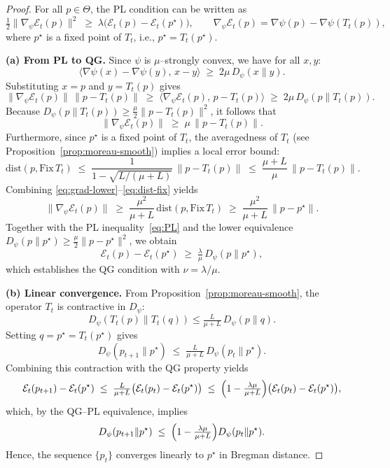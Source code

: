 \documentclass[11pt]{article}
\newcommand{\Ecal}{\mathcal{E}}
\theoremstyle{plain}
\theoremstyle{definition}
\theoremstyle{remark}
\begin{document}
\begin{proof}
For all $p\in\Theta$, the PL condition can be written as
\begin{equation}
\tfrac12\|\nabla_\psi \Ecal_t(p)\|^2 
\;\ge\; \lambda\big(\Ecal_t(p)-\Ecal_t(p^\star)\big),
\qquad
\nabla_\psi \Ecal_t(p)=\nabla\psi(p)-\nabla\psi(T_t(p)),
\label{eq:PL}
\end{equation}
where $p^\star$ is a fixed point of $T_t$, i.e., $p^\star=T_t(p^\star)$.

\medskip
\noindent\textbf{(a) From PL to QG.}
Since $\psi$ is $\mu$--strongly convex, we have for all $x,y$:
\begin{equation}
\langle \nabla\psi(x)-\nabla\psi(y),\,x-y\rangle 
\;\ge\; 2\mu\,D_\psi(x\|y).
\label{eq:psi-strong}
\end{equation}
Substituting $x=p$ and $y=T_t(p)$ gives
\[
\|\nabla_\psi \Ecal_t(p)\|\,\|p-T_t(p)\|
\;\ge\;
\langle\nabla_\psi \Ecal_t(p),\,p-T_t(p)\rangle
\;\ge\; 2\mu\,D_\psi(p\|T_t(p)).
\]
Because $D_\psi(p\|T_t(p))\ge \tfrac{\mu}{2}\|p-T_t(p)\|^2$, it follows that
\begin{equation}
\|\nabla_\psi \Ecal_t(p)\|\;\ge\;\mu\,\|p-T_t(p)\|.
\label{eq:grad-lower}
\end{equation}
Furthermore, since $p^\star$ is a fixed point of $T_t$, the averagedness of $T_t$ (see Proposition~\ref{prop:moreau-smooth}) implies a local error bound:
\begin{equation}
\mathrm{dist}(p,\mathrm{Fix}\,T_t)
\;\le\;
\frac{1}{1-\sqrt{L/(\mu+L)}}\,\|p-T_t(p)\|
\;\le\;\frac{\mu+L}{\mu}\,\|p-T_t(p)\|.
\label{eq:dist-fix}
\end{equation}
Combining \eqref{eq:grad-lower}--\eqref{eq:dist-fix} yields
\[
\|\nabla_\psi \Ecal_t(p)\|
\;\ge\;\frac{\mu^2}{\mu+L}\,\mathrm{dist}(p,\mathrm{Fix}\,T_t)
\;\ge\;\frac{\mu^2}{\mu+L}\,\|p-p^\star\|.
\]
Together with the PL inequality~\eqref{eq:PL} and the lower equivalence 
$D_\psi(p\|p^\star)\ge\tfrac{\mu}{2}\|p-p^\star\|^2$, we obtain
\[
\Ecal_t(p)-\Ecal_t(p^\star)
\;\ge\;
\tfrac{\lambda}{\mu}\,D_\psi(p\|p^\star),
\]
which establishes the QG condition with $\nu=\lambda/\mu$.

\medskip
\noindent\textbf{(b) Linear convergence.}
From Proposition~\ref{prop:moreau-smooth}, the operator $T_t$ is contractive in $D_\psi$:
\begin{equation}
D_\psi(T_t(p)\|T_t(q))\le\tfrac{L}{\mu+L}\,D_\psi(p\|q).
\label{eq:averaged-bound}
\end{equation}
Setting $q=p^\star=T_t(p^\star)$ gives
\[
D_\psi(p_{t+1}\|p^\star)
\;\le\;\tfrac{L}{\mu+L}\,D_\psi(p_t\|p^\star).
\]
Combining this contraction with the QG property yields
\[
\Ecal_t(p_{t+1})-\Ecal_t(p^\star)
\;\le\;
\tfrac{L}{\mu+L}\big(\Ecal_t(p_t)-\Ecal_t(p^\star)\big)
\;\le\;
\Bigl(1-\tfrac{\lambda\mu}{\mu+L}\Bigr)
\big(\Ecal_t(p_t)-\Ecal_t(p^\star)\big),
\]
which, by the QG–PL equivalence, implies
\[
D_\psi(p_{t+1}\|p^\star)
\;\le\;
\Bigl(1-\tfrac{\lambda\mu}{\mu+L}\Bigr)
D_\psi(p_t\|p^\star).
\]
Hence, the sequence $\{p_t\}$ converges linearly to $p^\star$ in Bregman distance.
\end{proof}
\end{document}

